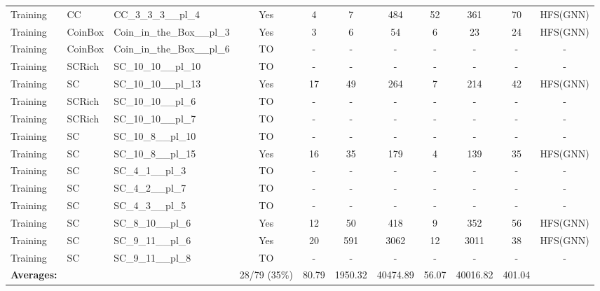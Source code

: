 \documentclass{article}
\begin{document}
\begin{tabular}{lllcccccccc}
Training & CC & CC\_3\_3\_3\_\_pl\_4 & Yes & 4 & 7 & 484 & 52 & 361 & 70 & HFS(GNN) \\
Training & CoinBox & Coin\_in\_the\_Box\_\_pl\_3 & Yes & 3 & 6 & 54 & 6 & 23 & 24 & HFS(GNN) \\
Training & CoinBox & Coin\_in\_the\_Box\_\_pl\_6 & TO & - & - & - & - & - & - & - \\
Training & SCRich & SC\_10\_10\_\_pl\_10 & TO & - & - & - & - & - & - & - \\
Training & SC & SC\_10\_10\_\_pl\_13 & Yes & 17 & 49 & 264 & 7 & 214 & 42 & HFS(GNN) \\
Training & SCRich & SC\_10\_10\_\_pl\_6 & TO & - & - & - & - & - & - & - \\
Training & SCRich & SC\_10\_10\_\_pl\_7 & TO & - & - & - & - & - & - & - \\
Training & SC & SC\_10\_8\_\_pl\_10 & TO & - & - & - & - & - & - & - \\
Training & SC & SC\_10\_8\_\_pl\_15 & Yes & 16 & 35 & 179 & 4 & 139 & 35 & HFS(GNN) \\
Training & SC & SC\_4\_1\_\_pl\_3 & TO & - & - & - & - & - & - & - \\
Training & SC & SC\_4\_2\_\_pl\_7 & TO & - & - & - & - & - & - & - \\
Training & SC & SC\_4\_3\_\_pl\_5 & TO & - & - & - & - & - & - & - \\
Training & SC & SC\_8\_10\_\_pl\_6 & Yes & 12 & 50 & 418 & 9 & 352 & 56 & HFS(GNN) \\
Training & SC & SC\_9\_11\_\_pl\_6 & Yes & 20 & 591 & 3062 & 12 & 3011 & 38 & HFS(GNN) \\
Training & SC & SC\_9\_11\_\_pl\_8 & TO & - & - & - & - & - & - & - \\
\textbf{Averages:} & & & 28/79 (35\%) & 80.79 & 1950.32 & 40474.89 & 56.07 & 40016.82 & 401.04 & \\
\bottomrule
\end{tabular}
\newpage
\end{document}
